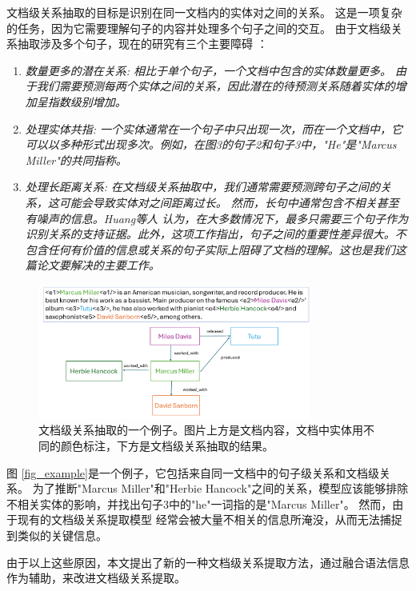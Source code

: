 \documentclass[bachelor]{thesis-uestc}
\begin{document}
文档级关系抽取的目标是识别在同一文档内的实体对之间的关系。
这是一项复杂的任务，因为它需要理解句子的内容并处理多个句子之间的交互。
由于文档级关系抽取涉及多个句子，现在的研究有三个主要障碍 \cite{9098945}：
\begin{enumerate}
    \item \em{数量更多的潜在关系}: 相比于单个句子，一个文档中包含的实体数量更多。
    由于我们需要预测每两个实体之间的关系，因此潜在的待预测关系随着实体的增加呈指数级别增加。
    \item \em{处理实体共指}: 一个实体通常在一个句子中只出现一次，而在一个文档中，它可以以多种形式出现多次。例如，在图3的句子2和句子3中，"He"是"Marcus Miller"的共同指称。
    \item \em{处理长距离关系}: 在文档级关系抽取中，我们通常需要预测跨句子之间的关系，这可能会导致实体对之间距离过长。
    然而，长句中通常包含不相关甚至有噪声的信息。Huang等人\cite{huang-etal-2021-three} 认为，在大多数情况下，最多只需要三个句子作为识别关系的支持证据。此外，这项工作指出，句子之间的重要性差异很大。不包含任何有价值的信息或关系的句子实际上阻碍了文档的理解。这也是我们这篇论文要解决的主要工作。
\end{enumerate}
\begin{figure}[h]
    \centering
    \caption{文档级关系抽取的一个例子。图片上方是文档内容，文档中实体用不同的颜色标注，下方是文档级关系抽取的结果。}
    \includegraphics[width=0.8\textwidth]{misc/fig_example.pdf}
\end{figure}\label{fig_example}

图 \ref{fig_example}是一个例子，它包括来自同一文档中的句子级关系和文档级关系。
为了推断"Marcus Miller"和"Herbie Hancock"之间的关系，模型应该能够排除不相关实体的影响，并找出句子3中的"he"一词指的是"Marcus Miller"。
然而，由于现有的文档级关系提取模型 \cite{bai-etal-2021-syntax} 经常会被大量不相关的信息所淹没，从而无法捕捉到类似的关键信息。 \par

由于以上这些原因，本文提出了新的一种文档级关系提取方法，通过融合语法信息作为辅助，来改进文档级关系提取。\par
\end{document}
